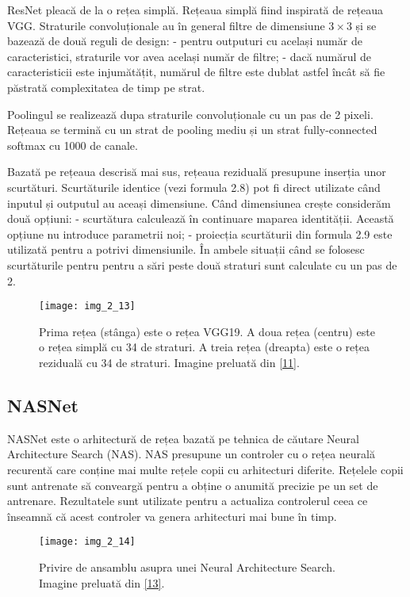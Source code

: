 ResNet pleacă de la o rețea simplă. Rețeaua simplă fiind inspirată de rețeaua VGG. Straturile convoluționale au în general filtre de dimensiune $3\times3$ și se bazează de două reguli de design: - pentru outputuri cu același număr de caracteristici, straturile vor avea același număr de filtre; - dacă numărul de caracteristicii este injumătățit, numărul de filtre este dublat astfel încât să fie păstrată complexitatea de timp pe strat.

Poolingul se realizează dupa straturile convoluționale cu un pas de 2 pixeli. Rețeaua se termină cu un strat de pooling mediu și un strat fully-connected softmax cu 1000 de canale.

Bazată pe rețeaua descrisă mai sus, rețeaua reziduală presupune inserția unor scurtături. Scurtăturile identice (vezi formula 2.8) pot fi direct utilizate când inputul și outputul au aceași dimensiune. Când dimensiunea crește considerăm două opțiuni: - scurtătura calculează în continuare maparea identității. Această opțiune nu introduce parametrii noi; - proiecția scurtăturii din formula 2.9 este utilizată pentru a potrivi dimensiunile. În ambele situații când se folosesc scurtăturile pentru pentru a sări peste două straturi sunt calculate cu un pas de 2.

\begin{figure}[!h]
	\centering
	\texttt{[image: img\_2\_13]}
	\caption[Rețeaua ResNet]{Prima rețea (stânga) este o rețea VGG19. A doua rețea (centru) este o rețea simplă cu 34 de straturi. A treia rețea (dreapta) este o rețea reziduală cu 34 de straturi. Imagine preluată din \hyperlink{KaimingHeXiangyuZhangShaoqingRenJianSun}{[11]}.}
\end{figure}  


\subsection{NASNet}
NASNet este o arhitectură de rețea bazată pe tehnica de căutare Neural Architecture Search (NAS). NAS presupune un controler cu o rețea neurală recurentă care conține mai multe rețele copii cu arhitecturi diferite. Rețelele copii sunt antrenate să conveargă pentru a obține o anumită precizie pe un set de antrenare. Rezultatele sunt utilizate pentru a actualiza controlerul ceea ce înseamnă că acest controler va genera arhitecturi mai bune în timp.

\begin{figure}[!h]
	\centering
	\texttt{[image: img\_2\_14]}
	\caption[NAS]{Privire de ansamblu asupra unei Neural Architecture Search. Imagine preluată din \hyperlink{Zoph2018LearningTA}{[13]}.}
\end{figure}  


